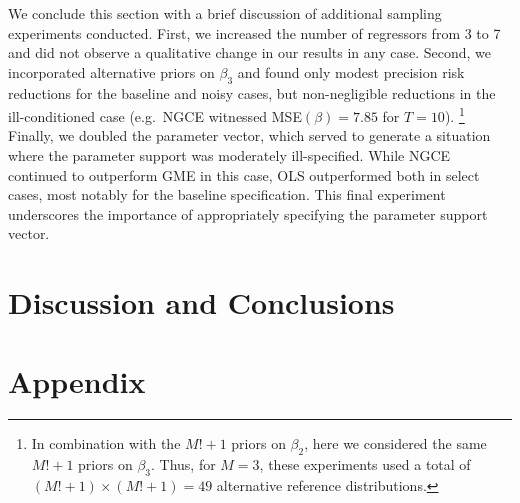 \documentclass{elsarticle}
\begin{document}
We conclude this section with a brief discussion of additional sampling 
experiments conducted. 
First, we increased the number of regressors from 3 to 7 and did not observe a 
qualitative change in our results in any case.
Second, we incorporated alternative priors on $\beta_3$ and found only 
modest precision risk reductions for the baseline and noisy cases, but 
non-negligible reductions in the ill-conditioned case (e.g.\ NGCE witnessed 
MSE$(\beta)=7.85$ for $T=10$).%
\footnote{In combination with the $M! + 1$ priors on $\beta_2$, here we 
considered the same $M! + 1$ priors on $\beta_3$.
Thus, for $M=3$, these experiments used a total of $(M! + 1)\times (M! + 1) 
= 49$ alternative reference distributions.}
Finally, we doubled the parameter vector, which served to generate a situation 
where the parameter support was moderately ill-specified.
While NGCE continued to outperform GME in this case, OLS outperformed 
both in select cases, most notably for the baseline specification.
This final experiment underscores the importance of appropriately specifying
the parameter support vector.


\section{Discussion and Conclusions}
\label{sec: conc}




\newpage
\section*{Appendix}
\label{sec: appendix}
\end{document}
